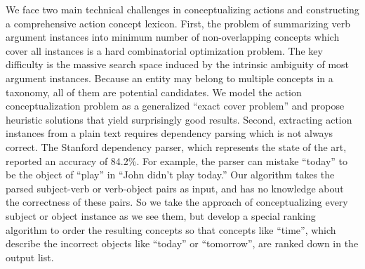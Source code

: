 We face two main technical challenges in conceptualizing actions and
constructing a comprehensive action concept lexicon.
First, the problem of summarizing verb argument instances into
minimum number of non-overlapping concepts which cover all instances
is a hard combinatorial optimization
problem. The key difficulty is the massive search space induced by the
intrinsic ambiguity of most argument instances. Because an entity may
belong to multiple concepts in a taxonomy,
all of them are potential candidates.
We model the action conceptualization problem as a generalized
``exact cover problem'' and propose heuristic solutions that yield
surprisingly good results.
Second, extracting action instances from a plain text requires
dependency parsing which is not always correct.
The Stanford dependency parser, which represents the state of the art,
reported an accuracy of 84.2\%. For example, the parser can mistake
``today'' to be the object of ``play'' in ``John didn't play today.''
Our algorithm takes the parsed subject-verb or verb-object pairs as input,
and has no knowledge about the correctness of these pairs. So we take the
approach of conceptualizing every subject or object instance as we see them,
but develop a special ranking algorithm to order the resulting concepts
so that concepts like ``time'', which describe the incorrect objects like
``today'' or ``tomorrow'', are ranked down in the output list.

